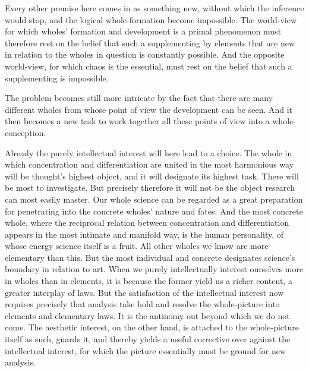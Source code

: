 \documentclass[12pt,a4paper]{book}
\newcommand{\opage}[1]{\marginnote{\footnotesize\textit{[#1]}}}
\begin{document}
\opage{341}Every other premise here comes in as something new, without which the inference would stop, and the
logical whole-formation become impossible. The world-view for which wholes' formation and development is a
primal phenomenon must therefore rest on the belief that such a supplementing by elements that are new in
relation to the wholes in question is constantly possible. And the opposite world-view, for which chaos is
the essential, must rest on the belief that such a supplementing is impossible.

The problem becomes still more intricate by the fact that there are many different wholes from whose point
of view the development can be seen. And it then becomes a new task to work together all these points of view
into a whole-conception.

Already the purely intellectual interest will here lead to a choice. The whole in which concentration and
differentiation are united in the most harmonious way will be thought's highest object, and it will
designate its highest task. There will be most to investigate. But precisely therefore it will not be the
object research can most easily master. Our whole science can be regarded as a great preparation for
penetrating into the concrete wholes' nature and fates. And the most concrete whole, where the
reciprocal relation between concentration and differentiation appears in the most intimate and manifold
way, is the human personality, of whose energy science itself is a fruit. All other wholes we know are
more elementary than this. But the most individual and concrete designates science's boundary in relation
to art. When we purely intellectually interest ourselves more in wholes than in elements, it is because
the former yield us a richer content, a greater interplay of laws. But the satisfaction of the
intellectual interest now requires precisely that analysis take hold and resolve the whole-picture into
elements and elementary laws. It is the antinomy out beyond which we do not come. The aesthetic interest,
on the other hand, is attached to the whole-picture itself as such, guards it, and thereby yields a useful
corrective over against the intellectual interest, \opage{342}for which the picture essentially must be ground for new
analysis.
\end{document}
